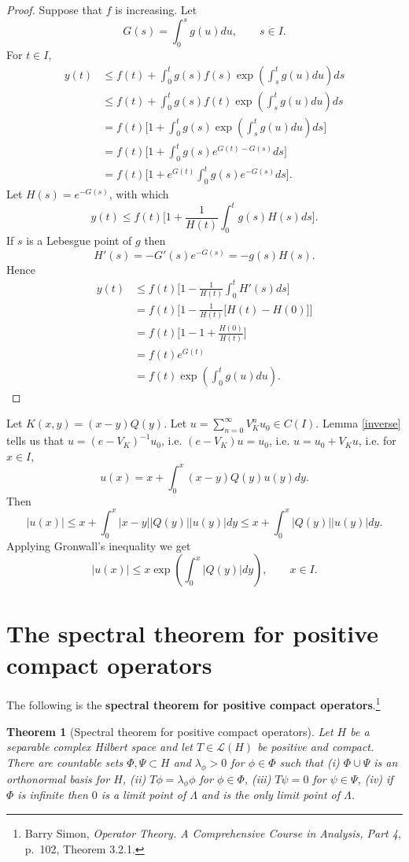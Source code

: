 \documentclass{article}
\newtheorem{theorem}{Theorem}
\theoremstyle{definition}
\begin{document}
\begin{proof}
Suppose that $f$ is increasing. 
Let
\[
G(s) = \int_0^s g(u) du,\qquad s \in I.
\] 
For $t \in I$,
\begin{align*}
y(t)&\leq f(t) + \int_0^t g(s) f(s) \exp\left(\int_s^t g(u) du\right) ds\\
&\leq f(t) + \int_0^t g(s) f(t) \exp\left(\int_s^t g(u) du\right) ds\\
&=f(t) \bigg[1+\int_0^t g(s) \exp\left(\int_s^t g(u) du\right) ds\bigg]\\
&=f(t)\bigg[1+\int_0^t g(s) e^{G(t)-G(s)} ds\bigg]\\
&=f(t)\bigg[1+e^{G(t)} \int_0^t g(s) e^{-G(s)} ds\bigg].
\end{align*}
Let $H(s)=e^{-G(s)}$, with which
\[
y(t) \leq f(t)\bigg[1+\frac{1}{H(t)} \int_0^t g(s) H(s) ds\bigg].
\]
If $s$ is a Lebesgue point of $g$ then
\[
H'(s) = -G'(s) e^{-G(s)} = -g(s) H(s).
\]
Hence
\begin{align*}
y(t) &\leq f(t)\bigg[1-\frac{1}{H(t)} \int_0^t H'(s) ds\bigg]\\
&=f(t)\bigg[1-\frac{1}{H(t)} \bigg[H(t)-H(0)\bigg] \bigg]\\
&=f(t)\bigg[1-1 + \frac{H(0)}{H(t)}\bigg]\\
&=f(t) e^{G(t)}\\
&=f(t) \exp\left(\int_0^t g(u) du\right).
\end{align*}
\end{proof}

Let $K(x,y)=(x-y)Q(y)$. 
Let $u=\sum_{n=0}^\infty V_K^n u_0 \in C(I)$. Lemma \ref{inverse} tells us that $u=(e-V_K)^{-1}u_0$, i.e.
$(e-V_K)u=u_0$, i.e. $u=u_0+V_Ku$, i.e. for $x \in I$,
\[
u(x) = x + \int_0^x (x-y)Q(y) u(y) dy.
\]
Then
\[
|u(x)| \leq x + \int_0^x |x-y| |Q(y)| |u(y)| dy
\leq x+\int_0^x |Q(y)| |u(y)| dy.
\]
Applying Gronwall's inequality we get
\begin{equation}
|u(x)| \leq x \exp\left(\int_0^x |Q(y)| dy\right),\qquad x \in I.
\label{gronwall}
\end{equation}



\section{The spectral theorem for positive compact operators}
The following is the \textbf{spectral theorem for positive compact operators}.\footnote{Barry Simon, {\em Operator Theory. A Comprehensive Course in Analysis, Part 4},
p.~102, Theorem 3.2.1.}

\begin{theorem}[Spectral theorem for positive compact operators]
Let $H$ be a separable complex Hilbert space and let $T \in \mathscr{L}(H)$ be positive and compact.
There are countable sets $\Phi, \Psi \subset H$ and $\lambda_\phi>0$ for $\phi \in \Phi$
such that
(i) $\Phi \cup \Psi$ is an orthonormal basis for $H$,
(ii) $T\phi = \lambda_\phi \phi$ for $\phi \in \Phi$,
(iii) $T\psi = 0$ for $\psi \in \Psi$,
(iv) if $\Phi$ is infinite then $0$ is a limit point of $\Lambda$ and is the only limit point of $\Lambda$. 
\end{theorem}
\end{document}
